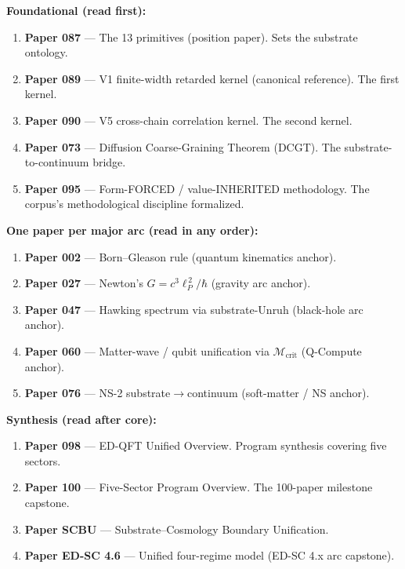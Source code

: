 \documentclass[11pt,a4paper]{article}
\begin{document}
\textbf{Foundational (read first):}

\begin{enumerate}[noitemsep]
\item \textbf{Paper 087} --- The 13 primitives (position paper). Sets the substrate ontology.
\item \textbf{Paper 089} --- V1 finite-width retarded kernel (canonical reference). The first kernel.
\item \textbf{Paper 090} --- V5 cross-chain correlation kernel. The second kernel.
\item \textbf{Paper 073} --- Diffusion Coarse-Graining Theorem (DCGT). The substrate-to-continuum bridge.
\item \textbf{Paper 095} --- Form-FORCED / value-INHERITED methodology. The corpus's methodological discipline formalized.
\end{enumerate}

\textbf{One paper per major arc (read in any order):}

\begin{enumerate}
\item \textbf{Paper 002} --- Born--Gleason rule (quantum kinematics anchor).
\item \textbf{Paper 027} --- Newton's $G = c^3 \ell_P^{\,2} / \hbar$ (gravity arc anchor).
\item \textbf{Paper 047} --- Hawking spectrum via substrate-Unruh (black-hole arc anchor).
\item \textbf{Paper 060} --- Matter-wave / qubit unification via $\mathcal{M}_\mathrm{crit}$ (Q-Compute anchor).
\item \textbf{Paper 076} --- NS-2 substrate$\to$continuum (soft-matter / NS anchor).
\end{enumerate}

\textbf{Synthesis (read after core):}

\begin{enumerate}
\item \textbf{Paper 098} --- ED-QFT Unified Overview. Program synthesis covering five sectors.
\item \textbf{Paper 100} --- Five-Sector Program Overview. The 100-paper milestone capstone.
\item \textbf{Paper SCBU} --- Substrate--Cosmology Boundary Unification.
\item \textbf{Paper ED-SC 4.6} --- Unified four-regime model (ED-SC 4.x arc capstone).
\end{enumerate}
\end{document}
